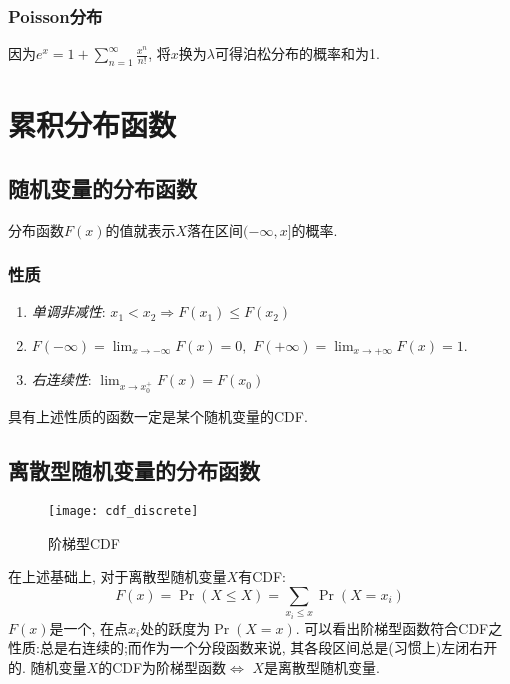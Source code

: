 \subsubsection{Poisson分布}
因为$e^x=1+\sum_{n=1}^{\infty}\frac{x^n}{n!}$, 将$x$换为$\lambda$可得泊松分布的概率和为1.
\section{累积分布函数}
\subsection{随机变量的分布函数}
分布函数$F(x)$的值就表示$X$落在区间$(-\infty, x]$的概率.
\subsubsection{性质}
\begin{enumerate}
    \item \textit{单调非减性}: $x_1<x_2\Rightarrow F(x_1)\leq F(x_2)$
    \item $F(-\infty) = \lim_{x\rightarrow -\infty}F(x) = 0, \, \, F(+\infty) = \lim_{x\rightarrow +\infty}F(x) = 1$.
    \item \textit{右连续性}: $\lim_{x\rightarrow x_0^+}F(x) = F(x_0)$
\end{enumerate}
具有上述性质的函数一定是某个随机变量的CDF.
\newpage
\subsection{离散型随机变量的分布函数}
\begin{wrapfigure}[10]{r}{.3\textwidth}
    \centering
    \texttt{[image: cdf\_discrete]}
    \caption{阶梯型CDF}
\end{wrapfigure}
在上述基础上, 对于离散型随机变量$X$有CDF:
\[F(x) = \Pr(X\leq X) = \sum_{x_i\leq x}\Pr(X=x_i)\]
$F(x)$是一个, 在点$x_i$处的跃度为$\Pr(X=x)$.
可以看出阶梯型函数符合CDF之性质:总是右连续的;而作为一个分段函数来说, 其各段区间总是(习惯上)左闭右开的.
随机变量$X$的CDF为阶梯型函数$\Leftrightarrow$ $X$是离散型随机变量.
